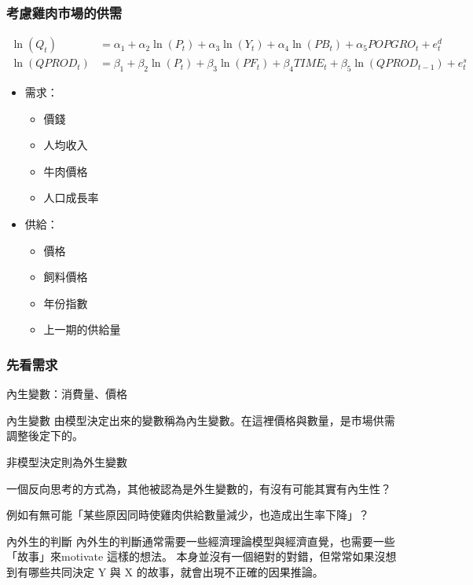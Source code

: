 \begin{frame}
    \frametitle{考慮雞肉市場的供需}

    {\footnotesize
    \begin{align*}
        \ln(Q_t) &= \alpha_1 + \alpha_2 \ln(P_t) + \alpha_3 \ln(Y_t) + \alpha_4 \ln(PB_t) + \alpha_5 POPGRO_t + e_t^d \\ 
        \ln(QPROD_t) &= \beta_1 + \beta_2 \ln(P_t) + \beta_3 \ln(PF_t) + \beta_4 TIME_t + \beta_5 \ln(QPROD_{t-1}) + e_t^s
    \end{align*}
    }

    \begin{itemize}
        \item 需求：
        \begin{itemize}
            \item 價錢
            \item 人均收入
            \item 牛肉價格
            \item 人口成長率
        \end{itemize}
        \item 供給：
        \begin{itemize}
            \item 價格
            \item 飼料價格
            \item 年份指數
            \item 上一期的供給量
        \end{itemize}
    \end{itemize}
\end{frame}

\begin{frame}
    \frametitle{先看需求}

    內生變數：消費量、價格

    \begin{block}{內生變數}
        由模型決定出來的變數稱為內生變數。在這裡價格與數量，是市場供需調整後定下的。

        非模型決定則為外生變數
    \end{block}

    \vfill
    一個反向思考的方式為，其他被認為是外生變數的，有沒有可能其實有內生性？

    例如有無可能「某些原因同時使雞肉供給數量減少，也造成出生率下降」？
    \pause
    \begin{exampleblock}{內外生的判斷}
        內外生的判斷通常需要一些經濟理論模型與經濟直覺，也需要一些「故事」來motivate 這樣的想法。
        本身並沒有一個絕對的對錯，但常常如果沒想到有哪些共同決定 Y 與 X 的故事，就會出現不正確的因果推論。
    \end{exampleblock}

\end{frame}

